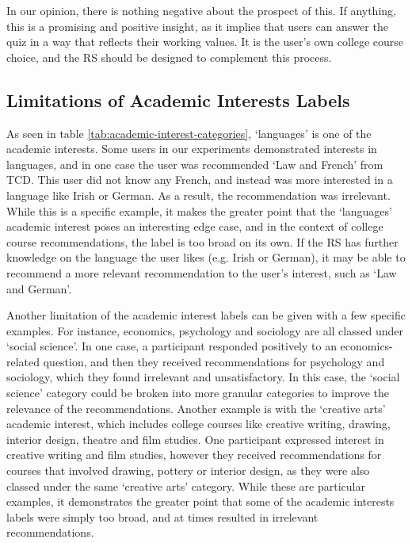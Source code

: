 In our opinion, there is nothing negative about the prospect of this.
If anything, this is a promising and positive insight,
as it implies that users can answer the quiz in a way that reflects their working values.
It is the user's own college course choice, 
and the RS should be designed to complement this process.

\subsection{Limitations of Academic Interests Labels}

As seen in table \ref{tab:academic-interest-categories}, `languages' is one of the academic interests.
Some users in our experiments demonstrated interests in languages,
and in one case the user was recommended `Law and French' from TCD.
This user did not know any French, and instead was more interested in a language like Irish or German.
As a result, the recommendation was irrelevant.
While this is a specific example, it makes the greater point that the `languages' academic interest poses an 
interesting edge case, and in the context of college course recommendations,
the label is too broad on its own.
If the RS has further knowledge on the language the user likes (e.g. Irish or German),
it may be able to recommend a more relevant recommendation to the user's interest,
such as `Law and German'.

Another limitation of the academic interest labels can be given with a few specific examples.
For instance, economics, psychology and sociology are all classed under `social science'.
In one case, a participant responded positively to an economics-related question,
and then they received recommendations for psychology and sociology, which they found irrelevant and unsatisfactory.
In this case, the `social science' category could be broken into more granular categories
to improve the relevance of the recommendations.
Another example is with the `creative arts' academic interest,
which includes college courses like creative writing, drawing, interior design, theatre and film studies.
One participant expressed interest in creative writing and film studies,
however they received recommendations for courses that involved drawing, pottery or interior design,
as they were also classed under the same `creative arts' category.
While these are particular examples, it demonstrates the greater point that 
some of the academic interests labels were simply too broad, and at times resulted in irrelevant recommendations.

